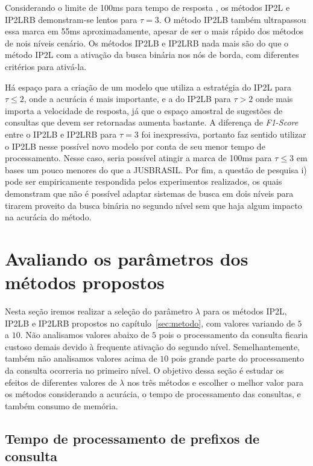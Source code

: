 Considerando o limite de 100ms para tempo de resposta \citep{ji2009efficient}, os métodos IP2L e IP2LRB demonstram-se lentos para $\tau=3$. O método IP2LB também ultrapassou essa marca em 55ms aproximadamente, apesar de ser o mais rápido dos métodos de nois níveis cenário. Os métodos IP2LB e IP2LRB nada mais são do que o método IP2L com a ativação da busca binária nos nós de borda, com diferentes critérios para ativá-la. 

Há espaço para a criação de um modelo que utiliza a estratégia do IP2L para $\tau \leq 2$, onde a acurácia é mais importante, e a do IP2LB para $\tau > 2$ onde mais importa a velocidade de resposta, já que o espaço amostral de sugestões de consultas que devem ser retornadas aumenta bastante. A diferença de \textit{F1-Score} entre o IP2LB e IP2LRB para $\tau=3$ foi inexpressiva, portanto faz sentido utilizar o IP2LB nesse possível novo modelo por conta de seu menor tempo de processamento. Nesse caso, seria possível atingir a marca de 100ms para $\tau \leq 3$ em bases um pouco menores do que a JUSBRASIL. Por fim, a questão de pesquisa i) pode ser empiricamente respondida pelos experimentos realizados, os quais demonstram que não é possível adaptar sistemas de busca em dois níveis para tirarem proveito da busca binária no segundo nível sem que haja algum impacto na acurácia do método.

\section{Avaliando os parâmetros dos métodos propostos}

Nesta seção iremos realizar a seleção do parâmetro $\lambda$ para os métodos IP2L, IP2LB e IP2LRB propostos no capítulo~\ref{sec:metodo}, com valores variando de $5$ a $10$. Não analisamos valores abaixo de $5$ pois o processamento da consulta ficaria custoso demais devido à frequente ativação do segundo nível. Semelhantemente, também não analisamos valores acima de $10$ pois grande parte do processamento da consulta ocorreria no primeiro nível. O objetivo dessa seção é estudar os efeitos de diferentes valores de $\lambda$ nos três métodos e escolher o melhor valor para os métodos considerando a acurácia, o tempo de processamento das consultas, e também consumo de memória.


\subsection{Tempo de processamento de prefixos de consulta}
\label{sec:methods-processing-time}

